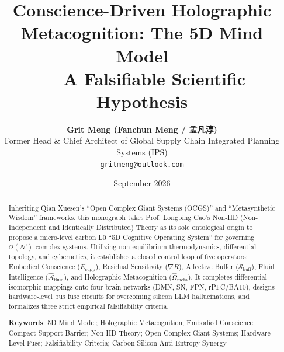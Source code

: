 \documentclass[11pt,a4paper]{article}
\title{\textbf{Conscience-Driven Holographic Metacognition: The 5D Mind Model}\\
\large --- A Falsifiable Scientific Hypothesis}
\author{\textbf{Grit Meng (Fanchun Meng / 孟凡淳)}\\
Former Head \& Chief Architect of Global Supply Chain Integrated Planning Systems (IPS)\\
\texttt{gritmeng@outlook.com}}
\date{September 2026}
\begin{document}
\maketitle

\begin{abstract}
Inheriting Qian Xuesen's ``Open Complex Giant Systems (OCGS)'' and ``Metasynthetic Wisdom'' frameworks, this monograph takes Prof. Longbing Cao's Non-IID (Non-Independent and Identically Distributed) Theory as its sole ontological origin to propose a micro-level carbon L0 ``5D Cognitive Operating System'' for governing $\mathcal{O}(N!)$ complex systems. Utilizing non-equilibrium thermodynamics, differential topology, and cybernetics, it establishes a closed control loop of five operators: Embodied Conscience ($E_{\text{supp}}$), Residual Sensitivity ($\nabla R$), Affective Buffer ($\mathcal{S}_{\text{buff}}$), Fluid Intelligence ($\hat{\mathcal{A}}_{\text{fluid}}$), and Holographic Metacognition ($\hat{\Omega}_{\text{meta}}$). It completes differential isomorphic mappings onto four brain networks (DMN, SN, FPN, rPFC/BA10), designs hardware-level bus fuse circuits for overcoming silicon LLM hallucinations, and formalizes three strict empirical falsifiability criteria.

\vspace{0.5em}
\noindent\textbf{Keywords}: 5D Mind Model; Holographic Metacognition; Embodied Conscience; Compact-Support Barrier; Non-IID Theory; Open Complex Giant Systems; Hardware-Level Fuse; Falsifiability Criteria; Carbon-Silicon Anti-Entropy Synergy
\end{abstract}
\end{document}
